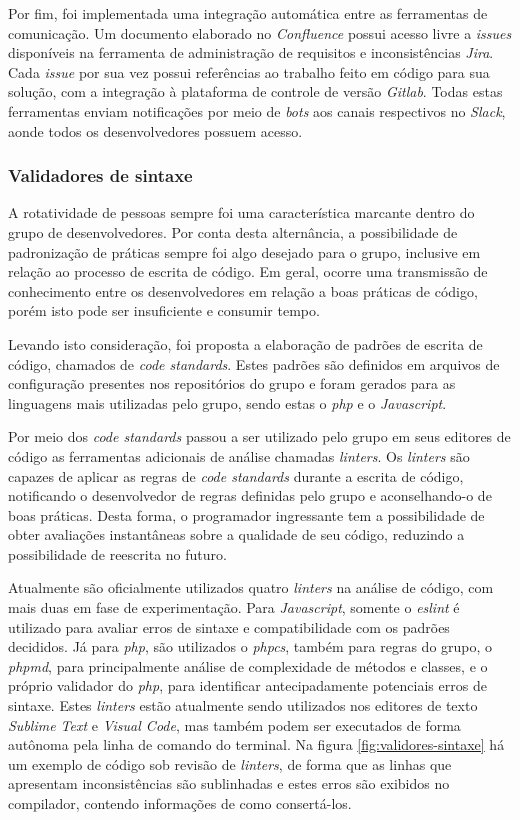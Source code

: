 Por fim, foi implementada uma integração automática entre as ferramentas de comunicação. Um documento elaborado no \emph{Confluence} possui acesso livre a \emph{issues} disponíveis na ferramenta de administração de requisitos e inconsistências \emph{Jira}. Cada \emph{issue} por sua vez possui referências ao trabalho feito em código para sua solução, com a integração à plataforma de controle de versão \emph{Gitlab}. Todas estas ferramentas enviam notificações por meio de \emph{bots} aos canais respectivos no \emph{Slack}, aonde todos os desenvolvedores possuem acesso.

\hypertarget{validadores-de-sintaxe}{%
\subsubsection{Validadores de sintaxe}\label{validadores-de-sintaxe}}

A rotatividade de pessoas sempre foi uma característica marcante dentro do grupo de desenvolvedores. Por conta desta alternância, a possibilidade de padronização de práticas sempre foi algo desejado para o grupo, inclusive em relação ao processo de escrita de código. Em geral, ocorre uma transmissão de conhecimento entre os desenvolvedores em relação a boas práticas de código, porém isto pode ser insuficiente e consumir tempo.

Levando isto consideração, foi proposta a elaboração de padrões de escrita de código, chamados de \emph{code standards}. Estes padrões são definidos em arquivos de configuração presentes nos repositórios do grupo e foram gerados para as linguagens mais utilizadas pelo grupo, sendo estas o \emph{php} e o \emph{Javascript}.

Por meio dos \emph{code standards} passou a ser utilizado pelo grupo em seus editores de código as ferramentas adicionais de análise chamadas \emph{linters}. Os \emph{linters} são capazes de aplicar as regras de \emph{code standards} durante a escrita de código, notificando o desenvolvedor de regras definidas pelo grupo e aconselhando-o de boas práticas. Desta forma, o programador ingressante tem a possibilidade de obter avaliações instantâneas sobre a qualidade de seu código, reduzindo a possibilidade de reescrita no futuro.

Atualmente são oficialmente utilizados quatro \emph{linters} na análise de código, com mais duas em fase de experimentação. Para \emph{Javascript}, somente o \emph{eslint} é utilizado para avaliar erros de sintaxe e compatibilidade com os padrões decididos. Já para \emph{php}, são utilizados o \emph{phpcs}, também para regras do grupo, o \emph{phpmd}, para principalmente análise de complexidade de métodos e classes, e o próprio validador do \emph{php}, para identificar antecipadamente potenciais erros de sintaxe. Estes \emph{linters} estão atualmente sendo utilizados nos editores de texto \emph{Sublime Text} e \emph{Visual Code}, mas também podem ser executados de forma autônoma pela linha de comando do terminal. Na figura \ref{fig:validores-sintaxe} há um exemplo de código sob revisão de \emph{linters}, de forma que as linhas que apresentam inconsistências são sublinhadas e estes erros são exibidos no compilador, contendo informações de como consertá-los.

